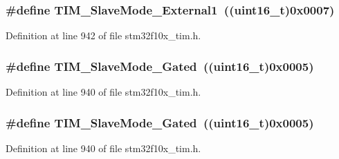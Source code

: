 \subsubsection[{\texorpdfstring{T\+I\+M\+\_\+\+Slave\+Mode\+\_\+\+External1}{TIM_SlaveMode_External1}}]{\setlength{\rightskip}{0pt plus 5cm}\#define T\+I\+M\+\_\+\+Slave\+Mode\+\_\+\+External1~(({\bf uint16\+\_\+t})0x0007)}\hypertarget{group___t_i_m___slave___mode_ga34427a693157ab177fead9871185bd35}{}\label{group___t_i_m___slave___mode_ga34427a693157ab177fead9871185bd35}


Definition at line 942 of file stm32f10x\+\_\+tim.\+h.

\subsubsection[{\texorpdfstring{T\+I\+M\+\_\+\+Slave\+Mode\+\_\+\+Gated}{TIM_SlaveMode_Gated}}]{\setlength{\rightskip}{0pt plus 5cm}\#define T\+I\+M\+\_\+\+Slave\+Mode\+\_\+\+Gated~(({\bf uint16\+\_\+t})0x0005)}\hypertarget{group___t_i_m___slave___mode_ga1f36c870b926f70b32f274bbc0bc39a5}{}\label{group___t_i_m___slave___mode_ga1f36c870b926f70b32f274bbc0bc39a5}


Definition at line 940 of file stm32f10x\+\_\+tim.\+h.

\subsubsection[{\texorpdfstring{T\+I\+M\+\_\+\+Slave\+Mode\+\_\+\+Gated}{TIM_SlaveMode_Gated}}]{\setlength{\rightskip}{0pt plus 5cm}\#define T\+I\+M\+\_\+\+Slave\+Mode\+\_\+\+Gated~(({\bf uint16\+\_\+t})0x0005)}\hypertarget{group___t_i_m___slave___mode_ga1f36c870b926f70b32f274bbc0bc39a5}{}\label{group___t_i_m___slave___mode_ga1f36c870b926f70b32f274bbc0bc39a5}


Definition at line 940 of file stm32f10x\+\_\+tim.\+h.

